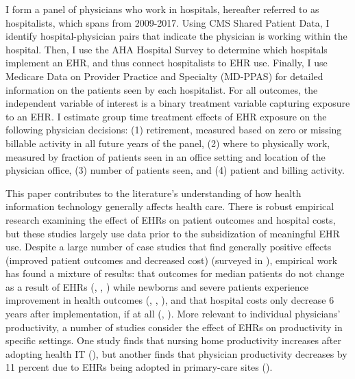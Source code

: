 \documentclass[12pt]{article}
\begin{document}
I form a panel of physicians who work in hospitals, hereafter referred to as hospitalists, which spans from 2009-2017. Using CMS Shared Patient Data, I identify hospital-physician pairs that indicate the physician is working within the hospital. Then, I use the AHA Hospital Survey to determine which hospitals implement an EHR, and thus connect hospitalists to EHR use. Finally, I use Medicare Data on Provider Practice and Specialty (MD-PPAS) for detailed information on the patients seen by each hospitalist. For all outcomes, the independent variable of interest is a binary treatment variable capturing exposure to an EHR. I estimate group time treatment effects of EHR exposure on the following physician decisions: (1) retirement, measured based on zero or missing billable activity in all future years of the panel, (2) where to physically work, measured by fraction of patients seen in an office setting and location of the physician office, (3) number of patients seen, and (4) patient and billing activity. 

This paper contributes to the literature's understanding of how health information technology generally affects health care. There is robust empirical research examining the effect of EHRs on patient outcomes and hospital costs, but these studies largely use data prior to the subsidization of meaningful EHR use. Despite a large number of case studies that find generally positive effects (improved patient outcomes and decreased cost) (surveyed in \cite{Buntin2011TheResults}), empirical work has found a mixture of results: that outcomes for median patients do not change as a result of EHRs (\cite{Agha2014TheCare}, \cite{McCullough2016HealthCoordination}, \cite{Meyerhoefer}) while newborns and severe patients experience improvement in health outcomes (\cite{Miller2009}, \cite{Freedman2015}, \cite{McCullough2016HealthCoordination}), and that hospital costs only decrease 6 years after implementation, if at all (\cite{Agha2014TheCare}, \cite{dranove2014trillion}). More relevant to individual physicians' productivity, a number of studies consider the effect of EHRs on productivity in specific settings. One study finds that nursing home productivity increases after adopting health IT (\cite{Hitt2016}), but another finds that physician productivity decreases by 11 percent due to EHRs being adopted in primary-care sites (\cite{Meyerhoefer}).  
\end{document}
